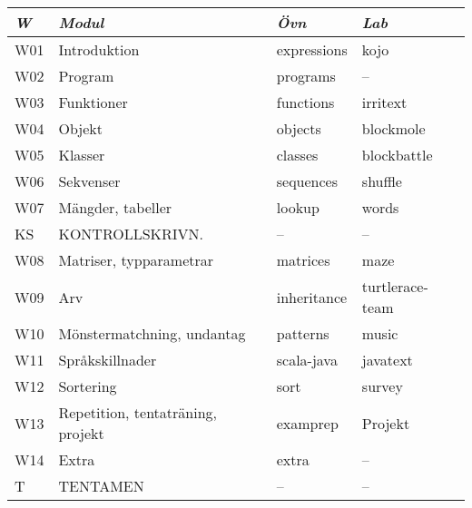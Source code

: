 \begin{tabular}{l|l|l|l}
\textit{W} & \textit{Modul} & \textit{Övn} & \textit{Lab} \\ \hline \hline
W01 & Introduktion & expressions & kojo \\
W02 & Program & programs & -- \\
W03 & Funktioner & functions & irritext \\
W04 & Objekt & objects & blockmole \\
W05 & Klasser & classes & blockbattle \\
W06 & Sekvenser & sequences & shuffle \\
W07 & Mängder, tabeller & lookup & words \\
KS & KONTROLLSKRIVN. & -- & -- \\
W08 & Matriser, typparametrar & matrices & maze \\
W09 & Arv & inheritance & turtlerace-team \\
W10 & Mönstermatchning, undantag & patterns & music \\
W11 & Språkskillnader & scala-java & javatext \\
W12 & Sortering & sort & survey \\
W13 & Repetition, tentaträning, projekt & examprep & Projekt \\
W14 & Extra & extra & -- \\
T & TENTAMEN & -- & -- \\
\end{tabular}
